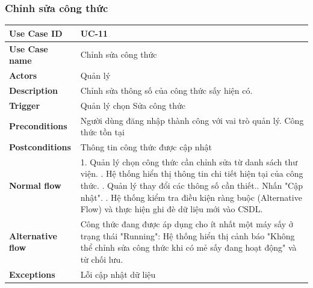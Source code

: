 \subsubsection{Chỉnh sửa công thức }
\begin{tabular}{|p{3.5cm}|p{9.5cm}|}
\hline
\textbf{Use Case ID} & UC-11 \\
\hline
\textbf{Use Case name} & Chỉnh sửa công thức \\
\hline
\textbf{Actors} & Quản lý \\
\hline
\textbf{Description} & 
Chỉnh sửa thông số của công thức sấy hiện có. \\
\hline
\textbf{Trigger} & Quản lý chọn Sửa công thức \\
\hline
\textbf{Preconditions} & Người dùng đăng nhập thành công với vai trò quản lý. Công thức tồn tại \\
\hline
\textbf{Postconditions} & Thông tin công thức được cập nhật \\
\hline
\textbf{Normal flow} & 
1. Quản lý chọn công thức cần chỉnh sửa từ danh sách thư viện. \newline
2. Hệ thống hiển thị thông tin chi tiết hiện tại của công thức. \newline
3. Quản lý thay đổi các thông số cần thiết.\newline
 4. Nhấn "Cập nhật". \newline
5. Hệ thống kiểm tra điều kiện ràng buộc (Alternative Flow) và thực hiện ghi đè dữ liệu mới vào CSDL. \\
\hline
\textbf{Alternative flow} & 
Công thức đang được áp dụng cho ít nhất một máy sấy ở trạng thái "Running": Hệ thống hiển thị cảnh báo "Không thể chỉnh sửa công thức khi có mẻ sấy đang hoạt động" và từ chối lưu. \\
\hline
\textbf{Exceptions} & Lỗi cập nhật dữ liệu \\
\hline
\end{tabular}


